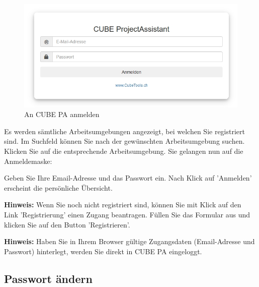 \begin{figure}   %
  \vspace{-20pt}      %
  \begin{center}
    \includegraphics[width=1\linewidth]{../chapters/02_GettingStarted/pictures/2-3_CUBEPA_Anmeldung.jpg}
  \end{center}
  \vspace{-20pt}
  \caption{An CUBE PA anmelden}
  \vspace{-10pt}
\end{figure}
Es werden sämtliche Arbeitsumgebungen angezeigt, bei welchen Sie registriert sind. Im Suchfeld können Sie nach der gewünschten Arbeitsumgebung suchen. Klicken Sie auf die entsprechende Arbeitsumgebung. Sie gelangen nun auf die Anmeldemaske:

\vspace{\baselineskip}

Geben Sie Ihre Email-Adresse und das Passwort ein. Nach Klick auf 'Anmelden' erscheint die persönliche Übersicht.

\vspace{\baselineskip}

\textbf{Hinweis:} Wenn Sie noch nicht registriert sind, können Sie mit Klick auf den Link 'Registrierung' einen Zugang beantragen. Füllen Sie das Formular aus und klicken Sie auf den Button 'Registrieren'.

\vspace{.2cm}

\textbf{Hinweis:} Haben Sie in Ihrem Browser gültige Zugangsdaten (Email-Adresse und Passwort) hinterlegt, werden Sie direkt in CUBE PA eingeloggt.

\subsection{Passwort ändern}
\label{bkm:Ref434828103}

